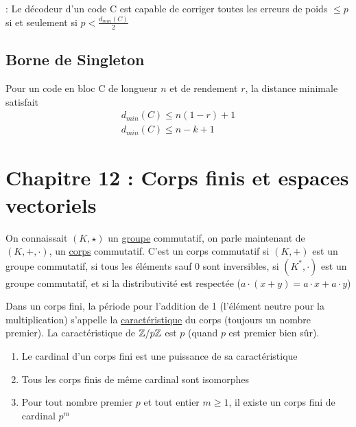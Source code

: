 \documentclass[11pt,a4paper]{article}
\begin{document}
 : Le décodeur d'un code C est capable de corriger toutes les erreurs de poids $\leq p$ si et seulement si $p < \frac{d_{min}(C)}{2}$ 

\subsection{Borne de Singleton}
\label{Singleton}
Pour un code en bloc C de longueur $n$ et de rendement $r$, la distance minimale satisfait 
\begin{align*}
		d_{min}(C) \leq n(1-r) + 1\\
		d_{min}(C) \leq n- k + 1
\end{align*}

\section[Corps fini, espace vectoriel]{Chapitre 12 : Corps finis et espaces vectoriels}

On connaissait $(K,\star)$ un \uline{groupe} commutatif, on parle maintenant de $(K,+,\cdot)$, un \uline{corps} commutatif. C'est un corps commutatif si $(K,+)$ est un groupe commutatif, si tous les éléments sauf 0 sont inversibles, si $(K^*,\cdot)$ est un groupe commutatif, et si la distributivité est respectée \big($a\cdot(x+y) = a\cdot x + a\cdot y$\big)

Dans un corps fini, la période pour l'addition de 1 (l'élément neutre pour la multiplication) s'appelle la \uline{caractéristique} du corps (toujours un nombre premier). La caractéristique de $\mathbb{Z}/p\mathbb{Z}$ est $p$ (quand $p$ est premier bien sûr).\\
\begin{enumerate}
	\item 	Le cardinal d'un corps fini est une puissance de sa caractéristique
	\item 	Tous les corps finis de même cardinal sont isomorphes
	\item 	Pour tout nombre premier $p$ et tout entier $m \geq 1$, il existe un corps fini de cardinal $p^m$
\end{enumerate}
\end{document}
